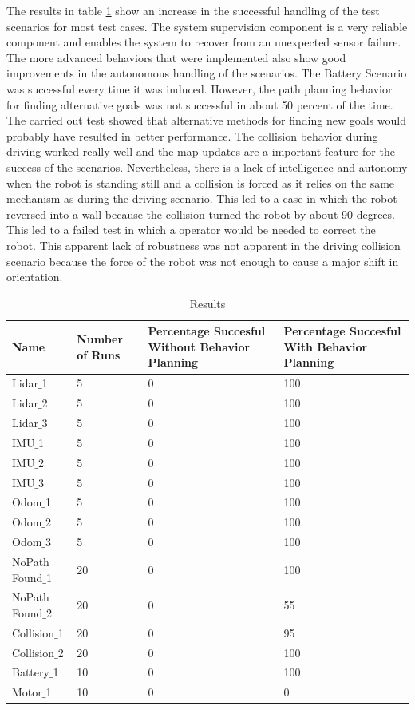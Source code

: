 The results in table \ref{tab:results} show an increase in the successful handling of the test scenarios for most test cases. The system supervision component is a very reliable component and enables the system to recover from an unexpected sensor failure. The more advanced behaviors that were implemented also show good improvements in the autonomous handling of the scenarios. The Battery Scenario was successful every time it was induced. However, the path planning behavior for finding alternative goals was not successful in about 50 percent of the time. The carried out test showed that alternative methods for finding new goals would probably have resulted in better performance. The collision behavior during driving worked really well and the map updates are a important feature for the success of the scenarios. Nevertheless, there is a lack of intelligence and autonomy when the robot is standing still and a collision is forced as it relies on the same mechanism as during the driving scenario. This led to a case in which the robot reversed into a wall because the collision turned the robot by about 90 degrees. This led to a failed test in which a operator would be needed to correct the robot. This apparent lack of robustness was not apparent in the driving collision scenario because the force of the robot was not enough to cause a major shift in orientation. 


\begin{table}[ht]
\label{tab:results}
\caption{Results}
	\begin{tabular}{| m{} | m{}| m{} | m{}|} 
  	\hline
  	Name & Number of Runs &  Percentage Succesful Without Behavior Planning & Percentage Succesful With Behavior Planning\\ 
  	\hline
  	Lidar$\_$1 & 5 & 0 & 100 \\ 
  	\hline
  	Lidar$\_$2 & 5 & 0 & 100 \\ 
  	\hline
  	Lidar$\_$3 & 5 & 0 & 100 \\ 
  	\hline
  	IMU$\_$1 & 5 & 0 & 100 \\ 
  	\hline
  	IMU$\_$2 & 5 & 0 & 100 \\ 
  	\hline
  	IMU$\_$3 & 5 & 0 & 100 \\ 
  	\hline
  	Odom$\_$1 & 5 & 0 & 100 \\ 
  	\hline
  	Odom$\_$2 & 5 & 0 & 100 \\ 
  	\hline
  	Odom$\_$3 & 5 & 0 & 100 \\ 
  	\hline
  	NoPath Found$\_$1 & 20 & 0 & 100 \\ 
  	\hline
  	NoPath Found$\_$2 & 20 & 0 & 55 \\ 
  	\hline
  	Collision$\_$1 & 20 & 0 & 95 \\ 
  	\hline
  	Collision$\_$2 & 20 & 0 & 100 \\ 
  	\hline
  	Battery$\_$1 & 10 & 0 & 100 \\ 
  	\hline
  	Motor$\_$1 & 10 & 0 & 0 \\ 
  	\hline
	\end{tabular}
\end{table} 

